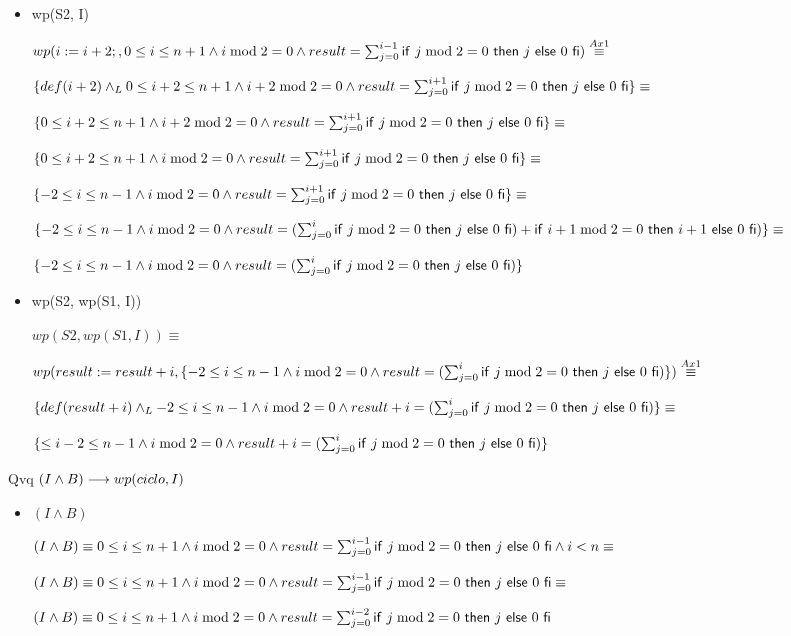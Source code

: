 \documentclass{article}
\begin{document}
\begin{itemize}
    \item wp(S2, I)

    $wp(i := i + 2;, 0 \leq i \leq n+1 \wedge i \bmod 2 = 0 \wedge result = \sum_{j=0}^{i-1} \mathsf{if}\ j \bmod 2 = 0\ \mathsf{then}\ j\ \mathsf{else}\ 0\ \mathsf{fi}) \stackrel{Ax1}{\equiv}$

    $\{ def(i+2) \land _L 0 \leq i+2 \leq n+1 \wedge i+2 \bmod 2 = 0 \wedge result = \sum_{j=0}^{i+1} \mathsf{if}\ j \bmod 2 = 0\ \mathsf{then}\ j\ \mathsf{else}\ 0\ \mathsf{fi} \}\equiv$

    $\{ 0 \leq i+2 \leq n+1 \wedge i+2 \bmod 2 = 0 \wedge result = \sum_{j=0}^{i+1} \mathsf{if}\ j \bmod 2 = 0\ \mathsf{then}\ j\ \mathsf{else}\ 0\ \mathsf{fi} \}\equiv$

    $\{ 0 \leq i+2 \leq n+1 \wedge i \bmod 2 = 0 \wedge result = \sum_{j=0}^{i+1} \mathsf{if}\ j \bmod 2 = 0\ \mathsf{then}\ j\ \mathsf{else}\ 0\ \mathsf{fi} \}\equiv$

    $\{ -2 \leq i \leq n-1 \wedge i \bmod 2 = 0 \wedge result = \sum_{j=0}^{i+1} \mathsf{if}\ j \bmod 2 = 0\ \mathsf{then}\ j\ \mathsf{else}\ 0\ \mathsf{fi} \}\equiv$

    $\{ -2 \leq i \leq n-1 \wedge i \bmod 2 = 0 \wedge result = (\sum_{j=0}^{i} \mathsf{if}\ j \bmod 2 = 0\ \mathsf{then}\ j\ \mathsf{else}\ 0\ \mathsf{fi}) + \mathsf{if}\ i+1 \bmod 2 = 0\ \mathsf{then}\ i+1\ \mathsf{else}\ 0\ \mathsf{fi}) \}\equiv$

    $\{ -2 \leq i \leq n-1 \wedge i \bmod 2 = 0 \wedge result = (\sum_{j=0}^{i} \mathsf{if}\ j \bmod 2 = 0\ \mathsf{then}\ j\ \mathsf{else}\ 0\ \mathsf{fi}) \}$

    \item wp(S2, wp(S1, I))

    $wp(S2, wp(S1, I)) \equiv$

    $wp(result := result + i, \{ -2 \leq i \leq n-1 \wedge i \bmod 2 = 0 \wedge result = (\sum_{j=0}^{i} \mathsf{if}\ j \bmod 2 = 0\ \mathsf{then}\ j\ \mathsf{else}\ 0\ \mathsf{fi}) \}) \stackrel{Ax1}{\equiv}$ 

    $\{ def(result + i) \land _L -2 \leq i \leq n-1 \wedge i \bmod 2 = 0 \wedge result + i = (\sum_{j=0}^{i} \mathsf{if}\ j \bmod 2 = 0\ \mathsf{then}\ j\ \mathsf{else}\ 0\ \mathsf{fi}) \}\equiv$

    $\{ \leq i -2 \leq n-1 \wedge i \bmod 2 = 0 \wedge result + i = (\sum_{j=0}^{i} \mathsf{if}\ j \bmod 2 = 0\ \mathsf{then}\ j\ \mathsf{else}\ 0\ \mathsf{fi}) \}$

\end{itemize}

Qvq $ (I \wedge B) \longrightarrow wp(ciclo, I) $

\begin{itemize}
    \item $( I \wedge B)$

    $( I \wedge B) \equiv 0 \leq i \leq n+1 \wedge i \bmod 2 = 0 \wedge result = \sum_{j=0}^{i-1} \mathsf{if}\ j \bmod 2 = 0\ \mathsf{then}\ j\ \mathsf{else}\ 0\ \mathsf{fi} \wedge i < n \equiv$

    $( I \wedge B) \equiv 0 \leq i \leq n+1 \wedge i \bmod 2 = 0 \wedge result = \sum_{j=0}^{i-1} \mathsf{if}\ j \bmod 2 = 0\ \mathsf{then}\ j\ \mathsf{else}\ 0\ \mathsf{fi} \equiv$

    $( I \wedge B) \equiv 0 \leq i \leq n+1 \wedge i \bmod 2 = 0 \wedge result = \sum_{j=0}^{i-2} \mathsf{if}\ j \bmod 2 = 0\ \mathsf{then}\ j\ \mathsf{else}\ 0\ \mathsf{fi}$
\end{itemize}
\end{document}
